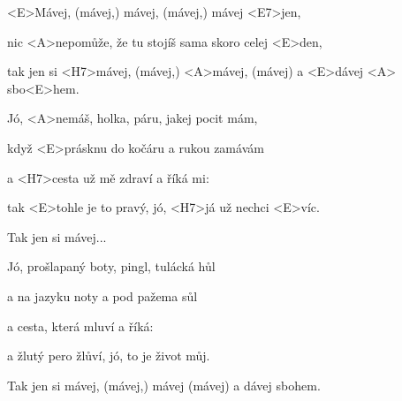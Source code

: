 

\zr
<E>Mávej, (mávej,) mávej, (mávej,) mávej <E7>jen,

nic <A>nepomůže, že tu stojíš sama skoro celej <E>den,

tak jen si <H7>mávej, (mávej,) <A>mávej, (mávej) a <E>dávej <A> sbo<E>hem.
\kr

\zs
Jó, <A>nemáš, holka, páru, jakej pocit mám,

když <E>prásknu do kočáru a rukou zamávám

a <H7>cesta už mě zdraví a říká mi: 

tak <E>tohle je to pravý, jó, <H7>já už nechci <E>víc.
\ks

\zr
Tak jen si mávej...
\kr

\zs
Jó, prošlapaný boty, pingl, tulácká hůl

a na jazyku noty a pod pažema sůl

a cesta, která mluví a říká: 

a žlutý pero žlůví, jó, to je život můj.
\ks

\zr\kr

Tak jen si mávej, (mávej,) mávej (mávej) a dávej sbohem.

\kp
